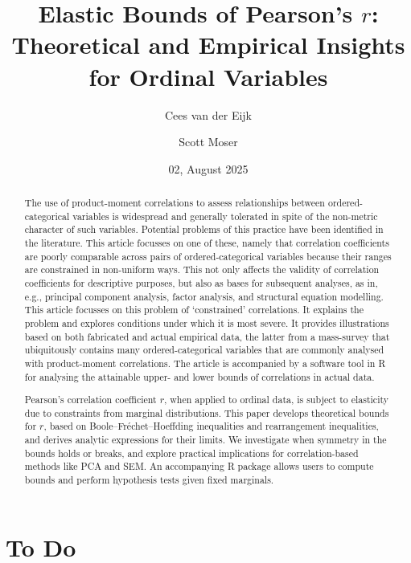 \documentclass[
  12pt,
]{article}
\title{Elastic Bounds of Pearson's \(r\): Theoretical and Empirical
Insights for Ordinal Variables}
\author{Cees van der Eijk \and Scott Moser}
\date{02, August 2025}
\theoremstyle{plain}
\theoremstyle{definition}
\renewcommand*\contentsname{Table of contents}
\newcommand\contentsname{Table of contents}
\theoremstyle{remark}
\begin{document}
\maketitle

\renewcommand*\contentsname{Table of contents}
{
\hypersetup{linkcolor=}
\setcounter{tocdepth}{3}
\tableofcontents
}

\newpage

\begin{abstract}
The use of product-moment correlations to assess relationships between ordered-categorical variables is widespread and generally tolerated in spite of the non-metric character of such variables. Potential problems of this practice have been identified in the literature. This article focusses on one of these, namely that correlation coefficients are poorly comparable across pairs of ordered-categorical variables because their ranges are constrained in non-uniform ways. This not only affects the validity of correlation coefficients for descriptive purposes, but also as bases for subsequent analyses, as in, e.g., principal component analysis, factor analysis, and structural equation modelling. This article focusses on this problem of ‘constrained’ correlations. It explains the problem and explores conditions under which it is most severe. It provides illustrations based on both fabricated and actual empirical data, the latter from a mass-survey that ubiquitously contains many ordered-categorical variables that are commonly analysed with product-moment correlations. The article is accompanied by a software tool in R for analysing the attainable upper- and lower bounds of correlations in actual data. 

Pearson’s correlation coefficient $r$, when applied to ordinal data, is subject to elasticity due to constraints from marginal distributions. This paper develops theoretical bounds for $r$, based on Boole–Fréchet–Hoeffding inequalities and rearrangement inequalities, and derives analytic expressions for their limits. We investigate when symmetry in the bounds holds or breaks, and explore practical implications for correlation-based methods like PCA and SEM. An accompanying R package allows users to compute bounds and perform hypothesis tests given fixed marginals.
\end{abstract}

\newpage

\section*{To Do}\label{to-do}
\end{document}
